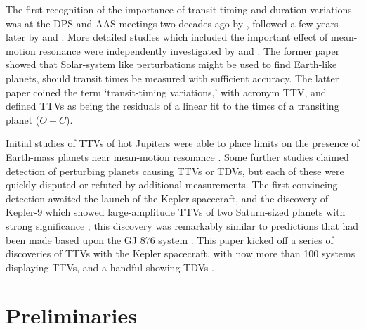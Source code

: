 \documentclass[graybox,natbib,nosecnum]{svmult}
\begin{document}
The first recognition of the importance of transit timing and duration variations was at the DPS and AAS meetings two decades ago by \citet{1996DPS....28.1208D,1996BAAS...28.1112D}, followed a few years later by \citet{2002ApJ...564.1019M} and \citet{Schneider2003,Schneider2004}.  More detailed studies which included the important effect of mean-motion resonance were independently investigated by \citet{2005Sci...307.1288H} and \citet{2005MNRAS.359..567A}.  The former paper showed that Solar-system like perturbations might be used to find Earth-like planets, should transit times be measured with sufficient accuracy.  The latter paper coined the term `transit-timing variations,' with acronym TTV, and defined TTVs as being the residuals of a linear fit to the times of a transiting planet ($O-C$).

Initial studies of TTVs of hot Jupiters were able to place limits on the presence of Earth-mass planets near mean-motion resonance \citep{2005MNRAS.364L..96S}.  Some further studies claimed detection of perturbing planets causing TTVs or TDVs, but each of these were quickly disputed or refuted by additional measurements.  The first convincing detection awaited the launch of the Kepler spacecraft, and the discovery of Kepler-9 which showed large-amplitude TTVs of two Saturn-sized planets with strong significance \citep{2010Sci...330...51H}; this discovery was remarkably similar to predictions that had been made based upon the GJ 876 system \citep{2005MNRAS.359..567A}.  This paper kicked off a series of discoveries of TTVs with the Kepler spacecraft, with now more than 100 systems displaying TTVs, and a handful showing TDVs \citep{2016ApJS..225....9H}.


\section{Preliminaries}
\end{document}
